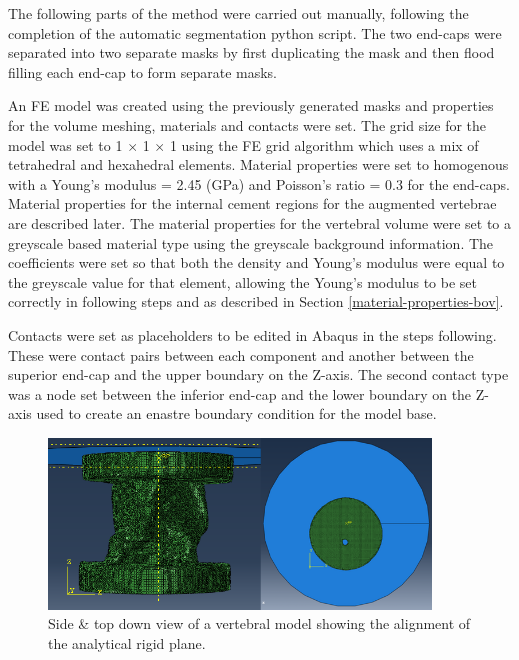 The following parts of the method were carried out manually, following the
completion of the automatic segmentation python script. The two end-caps were
separated into two separate masks by first duplicating the mask and then flood
filling each end-cap to form separate masks.

An FE model was created using the previously generated masks and properties for
the volume meshing, materials and contacts were set. The grid size for the
model was set to 1 $\times$ 1 $\times$ 1 using the FE grid algorithm which uses
a mix of tetrahedral and hexahedral elements. Material properties were set to
homogenous with a Young's modulus = 2.45 (GPa) and Poisson's ratio
= 0.3 for the end-caps. Material properties for the internal cement regions for
the augmented vertebrae are described later. The material properties for the vertebral volume were set to a
greyscale based material type using the greyscale background information. The
coefficients were set so that both the density and Young's modulus were equal
to the greyscale value for that element, allowing the Young's modulus to be set
correctly in following steps and as described in Section \cref{material-properties-bov}.

Contacts were set as placeholders to be edited in Abaqus in the steps
following. These were contact pairs between each component and another between
the superior end-cap and the upper boundary on the Z-axis. The second contact
type was a node set between the inferior end-cap and the lower boundary on the
Z-axis used to create an enastre boundary condition for the model base.

\begin{figure}[ht!]
\centering

  \includegraphics[width=4in]{images/abaqus_side_view_Both.png}
  \caption{Side \& top down view of a vertebral model showing the alignment of the analytical rigid plane.}
\label{fig:abaqus_top_view}
\end{figure}


